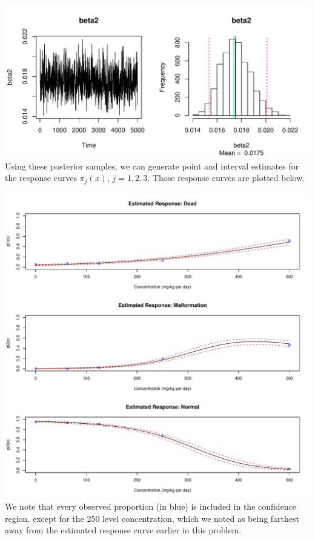 \documentclass[12pt]{article}
\begin{document}
\begin{enumerate}
\begin{enumerate}
	\includegraphics[scale = .7]{plot17.pdf} \\
	Using these posterior samples, we can generate point and interval estimates for the response curves $\pi_j(x)$, $j = 1,2,3$. Those response curves are plotted below. \\
	\newline
	
	\includegraphics[scale = .7]{plot18.pdf}\\
	\newline
	We note that every observed proportion (in blue) is included in the confidence region, except for the 250 level concentration, which we noted as being farthest away from the estimated response curve earlier in this problem. 
	
	
\end{enumerate}


\end{enumerate}
\end{document}
